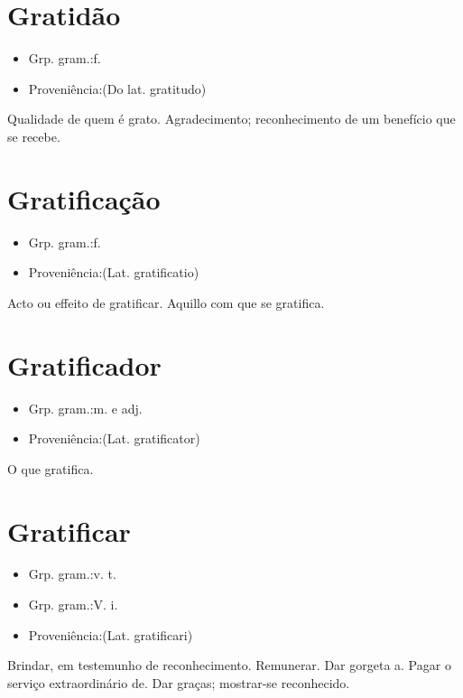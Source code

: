 \section{Gratidão}
\begin{itemize}
\item {Grp. gram.:f.}
\end{itemize}
\begin{itemize}
\item {Proveniência:(Do lat. \textunderscore gratitudo\textunderscore )}
\end{itemize}
Qualidade de quem é grato.
Agradecimento; reconhecimento de um benefício que se recebe.
\section{Gratificação}
\begin{itemize}
\item {Grp. gram.:f.}
\end{itemize}
\begin{itemize}
\item {Proveniência:(Lat. \textunderscore gratificatio\textunderscore )}
\end{itemize}
Acto ou effeito de gratificar.
Aquillo com que se gratifica.
\section{Gratificador}
\begin{itemize}
\item {Grp. gram.:m.  e  adj.}
\end{itemize}
\begin{itemize}
\item {Proveniência:(Lat. \textunderscore gratificator\textunderscore )}
\end{itemize}
O que gratifica.
\section{Gratificar}
\begin{itemize}
\item {Grp. gram.:v. t.}
\end{itemize}
\begin{itemize}
\item {Grp. gram.:V. i.}
\end{itemize}
\begin{itemize}
\item {Proveniência:(Lat. \textunderscore gratificari\textunderscore )}
\end{itemize}
Brindar, em testemunho de reconhecimento.
Remunerar.
Dar gorgeta a.
Pagar o serviço extraordinário de.
Dar graças; mostrar-se reconhecido.
